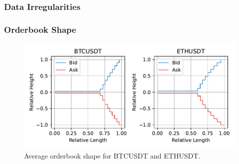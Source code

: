 \documentclass[handout]{beamer}
\begin{document}
\begin{frame}
    \frametitle{Data Irregularities}
        \begin{table}[ht]

            \caption{Summary statistics for the time difference between observations in ms, $\Delta t$ ms, for each trading pair.}
            \label{timedelta_table}
        \end{table}
\end{frame}

\begin{frame}
    \frametitle{Orderbook Shape}
    \begin{figure}[ht]
        \centering
        \includegraphics[width=1.0\textwidth]{./images/shapes_1.pdf}
        \caption{Average orderbook shape for BTCUSDT and ETHUSDT.}
        \label{shape1}
    \end{figure}
\end{frame}
\end{document}
